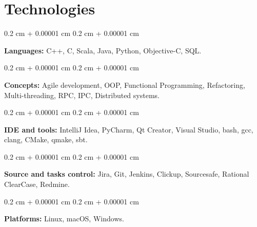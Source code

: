 \documentclass[10pt, letterpaper]{article}
\newenvironment{onecolentry}{
    \begin{adjustwidth}{
        0.2 cm + 0.00001 cm
    }{
        0.2 cm + 0.00001 cm
    }
}{
    \end{adjustwidth}
} %
\begin{document}
    
    \section{Technologies}

        
        \begin{onecolentry}
            \textbf{Languages:} C++, C, Scala, Java, Python, Objective-C, SQL.
        \end{onecolentry}

        \vspace{0.2 cm}

        \begin{onecolentry}
            \textbf{Concepts:} Agile development, OOP, Functional Programming, Refactoring, Multi-threading, RPC, IPC, Distributed systems.
        \end{onecolentry}

        \vspace{0.2 cm}

        \begin{onecolentry}
            \textbf{IDE and tools:} IntelliJ Idea, PyCharm, Qt Creator, Visual Studio, bash, gcc, clang, CMake, qmake, sbt.
        \end{onecolentry}

        \vspace{0.2 cm}

        \begin{onecolentry}
            \textbf{Source and tasks control:} Jira, Git, Jenkins, Clickup, Sourcesafe, Rational ClearCase, Redmine.
        \end{onecolentry}

        \vspace{0.2 cm}

        \begin{onecolentry}
            \textbf{Platforms:} Linux, macOS, Windows.
        \end{onecolentry}


    
\end{document}
